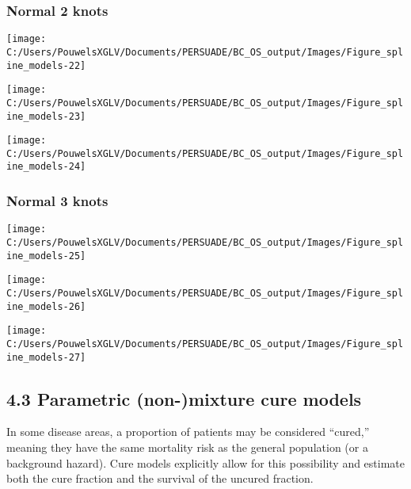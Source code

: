 \documentclass[
]{article}
\begin{document}
\subsubsection{Normal 2 knots}\label{normal-2-knots}

\begin{flushleft}\texttt{[image: C:/Users/PouwelsXGLV/Documents/PERSUADE/BC\_OS\_output/Images/Figure\_spline\_models-22]} \end{flushleft}

\begin{flushleft}\texttt{[image: C:/Users/PouwelsXGLV/Documents/PERSUADE/BC\_OS\_output/Images/Figure\_spline\_models-23]} \end{flushleft}

\begin{flushleft}\texttt{[image: C:/Users/PouwelsXGLV/Documents/PERSUADE/BC\_OS\_output/Images/Figure\_spline\_models-24]} \end{flushleft}

\clearpage

\subsubsection{Normal 3 knots}\label{normal-3-knots}

\begin{flushleft}\texttt{[image: C:/Users/PouwelsXGLV/Documents/PERSUADE/BC\_OS\_output/Images/Figure\_spline\_models-25]} \end{flushleft}

\begin{flushleft}\texttt{[image: C:/Users/PouwelsXGLV/Documents/PERSUADE/BC\_OS\_output/Images/Figure\_spline\_models-26]} \end{flushleft}

\begin{flushleft}\texttt{[image: C:/Users/PouwelsXGLV/Documents/PERSUADE/BC\_OS\_output/Images/Figure\_spline\_models-27]} \end{flushleft}

\clearpage

\subsection{4.3 Parametric (non-)mixture cure
models}\label{parametric-non-mixture-cure-models}

In some disease areas, a proportion of patients may be considered
``cured,'' meaning they have the same mortality risk as the general
population (or a background hazard). Cure models explicitly allow for
this possibility and estimate both the cure fraction and the survival of
the uncured fraction.
\end{document}
